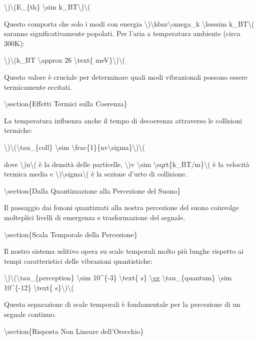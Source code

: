 \documentclass[a4paper,11pt]{article}
\begin{document}
\textbackslash{})\textbackslash{}(E\_\{th\} \textbackslash{}sim k\_BT\textbackslash{})\textbackslash{}(

Questo comporta che solo i modi con energia
\textbackslash{})\textbackslash{}hbar\textbackslash{}omega\_k \textbackslash{}lesssim k\_BT\textbackslash{}( saranno significativamente popolati. Per
l'aria a temperatura ambiente (circa 300K):

\textbackslash{})\textbackslash{}(k\_BT \textbackslash{}approx 26 \textbackslash{}text\{ meV\}\textbackslash{})\textbackslash{}(

Questo valore \`e cruciale per determinare quali modi vibrazionali possono
essere termicamente eccitati.

\textbackslash{}section\{Effetti Termici sulla Coerenza\}

La temperatura influenza anche il tempo di decoerenza attraverso le
collisioni termiche:

\textbackslash{})\textbackslash{}(\textbackslash{}tau\_\{coll\} \textbackslash{}sim \textbackslash{}frac\{1\}\{nv\textbackslash{}sigma\}\textbackslash{})\textbackslash{}(

dove \textbackslash{})n\textbackslash{}( \`e la densit\`a delle particelle, \textbackslash{})v \textbackslash{}sim \textbackslash{}sqrt\{k\_BT/m\}\textbackslash{}( \`e la
velocit\`a termica media e \textbackslash{})\textbackslash{}sigma\textbackslash{}( \`e la sezione d'urto di collisione.

\textbackslash{}section\{Dalla Quantizzazione alla Percezione del Suono\}

Il passaggio dai fononi quantizzati alla nostra percezione del suono
coinvolge molteplici livelli di emergenza e trasformazione del segnale.

\textbackslash{}section\{Scala Temporale della Percezione\}

Il nostro sistema uditivo opera su scale temporali molto pi\`u lunghe
rispetto ai tempi caratteristici delle vibrazioni quantistiche:

\textbackslash{})\textbackslash{}(\textbackslash{}tau\_\{perception\} \textbackslash{}sim 10\textasciicircum{}\{-3\} \textbackslash{}text\{ s\} \textbackslash{}gg \textbackslash{}tau\_\{quantum\} \textbackslash{}sim 10\textasciicircum{}\{-12\} \textbackslash{}text\{ s\}\textbackslash{})\textbackslash{}(

Questa separazione di scale temporali \`e fondamentale per la percezione
di un segnale continuo.

\textbackslash{}section\{Risposta Non Lineare dell'Orecchio\}
\end{document}
